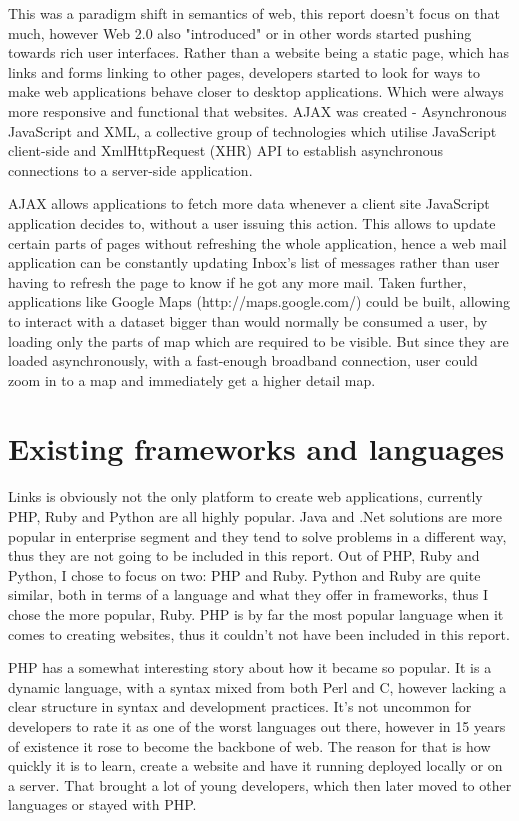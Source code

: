 This was a paradigm shift in semantics of web, this report doesn't focus on that much, however Web 2.0 also "introduced" or in other words started pushing towards rich user interfaces. Rather than a website being a static page, which has links and forms linking to other pages, developers started to look for ways to make web applications behave closer to desktop applications. Which were always more responsive and functional that websites. AJAX was created - Asynchronous JavaScript and XML, a collective group of technologies which utilise JavaScript client-side and XmlHttpRequest (XHR) API to establish asynchronous connections to a server-side application. 

AJAX allows applications to fetch more data whenever a client site JavaScript application decides to, without a user issuing this action. This allows to update certain parts of pages without refreshing the whole application, hence a web mail application can be constantly updating Inbox's list of messages rather than user having to refresh the page to know if he got any more mail. Taken further, applications like Google Maps (http://maps.google.com/) could be built, allowing to interact with a dataset bigger than would normally be consumed a user, by loading only the parts of map which are required to be visible. But since they are loaded asynchronously, with a fast-enough broadband connection, user could zoom in to a map and immediately get a higher detail map.

\section{Existing frameworks and languages}

Links is obviously not the only platform to create web applications, currently PHP, Ruby and Python are all highly popular. Java and .Net solutions are more popular in enterprise segment and they tend to solve problems in a different way, thus they are not going to be included in this report. Out of PHP, Ruby and Python, I chose to focus on two: PHP and Ruby. Python and Ruby are quite similar, both in terms of a language and what they offer in frameworks, thus I chose the more popular, Ruby. PHP is by far the most popular language when it comes to creating websites\citep{popular-php}, thus it couldn't not have been included in this report. 

PHP has a somewhat interesting story about how it became so popular. It is a dynamic language, with a syntax mixed from both Perl and C, however lacking a clear structure in syntax and development practices. It's not uncommon for developers to rate it as one of the worst languages out there\citep{worst-php}, however in 15 years of existence it rose to become the backbone of web. The reason for that is how quickly it is to learn, create a website and have it running deployed locally or on a server. That brought a lot of young developers, which then later moved to other languages or stayed with PHP. 

